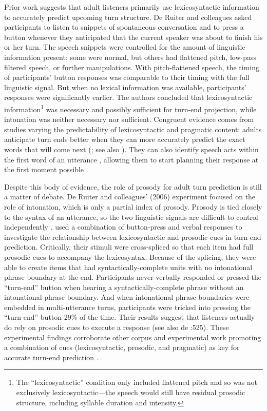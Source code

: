 \documentclass[authoryear, 12pt]{elsarticle}
\begin{document}
Prior work suggests that adult listeners primarily use lexicosyntactic information to accurately predict upcoming turn structure. De Ruiter and colleagues \citeyearpar{de-ruiter2006} asked participants to listen to snippets of spontaneous conversation and to press a button whenever they anticipated that the current speaker was about to finish his or her turn. The speech snippets were controlled for the amount of linguistic information present; some were normal, but others had flattened pitch, low-pass filtered speech, or further manipulations. With pitch-flattened speech, the timing of participants' button responses was comparable to their timing with the full linguistic signal. But when no lexical information was available, participants' responses were significantly earlier. The authors concluded that lexicosyntactic information\footnote{The ``lexicosyntactic'' condition only included flattened pitch and so was not exclusively lexicosyntactic---the speech would still have residual prosodic structure, including syllable duration and intensity.} was necessary and possibly sufficient for turn-end projection, while intonation was neither necessary nor sufficient. Congruent evidence comes from studies varying the predictability of lexicosyntactic and pragmatic content: adults anticipate turn ends better when they can more accurately predict the exact words that will come next (\citealp{magyari2012}; see also \citealp{magyari2014}). They can also identify speech acts within the first word of an utterance \citep{gisladottir2015}, allowing them to start planning their response at the first moment possible \citep{bogels2015}.

Despite this body of evidence, the role of prosody for adult turn prediction is still a matter of debate. De Ruiter and colleagues' (2006) experiment focused on the role of intonation, which is only a partial index of prosody. Prosody is tied closely to the syntax of an utterance, so the two linguistic signals are difficult to control independently \citep{ford1996}. \citet*{torreira2015} used a combination of button-press and verbal responses to investigate the relationship between lexicosyntactic and prosodic cues in turn-end prediction. Critically, their stimuli were cross-spliced so that each item had full prosodic cues to accompany the lexicosyntax. Because of the splicing, they were able to create items that had syntactically-complete units with no intonational phrase boundary at the end. Participants never verbally responded or pressed the ``turn-end'' button when hearing a syntactically-complete phrase without an intonational phrase boundary. And when intonational phrase boundaries were embedded in multi-utterance turns, participants were tricked into pressing the ``turn-end'' button 29\% of the time. Their results suggest that listeners actually do rely on prosodic cues to execute a response (see also de \citet{de-ruiter2006}:525). These experimental findings corroborate other corpus and experimental work promoting a combination of cues (lexicosyntactic, prosodic, and pragmatic) as key for accurate turn-end prediction \citep{duncan1972, ford1996, hirvenkari2013}. 
\end{document}
